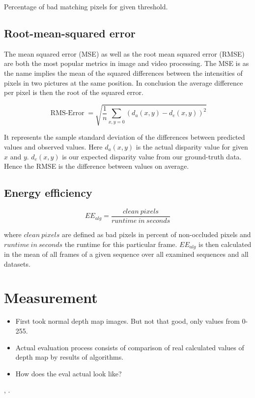 \noindent Percentage of bad matching pixels for given threshold.

\subsection*{Root-mean-squared error}

The mean squared error (MSE) as well as the root mean squared error (RMSE) are both the most popular metrics in image and video processing.
The MSE is as the name implies the mean of the squared differences between the intensities of pixels in two pictures at the same position.
In conclusion the average difference per pixel is then the root of the squared error.

\begin{equation}
  \operatorname{RMS-Error}=\sqrt{\frac{1}{n} \sum_{x,y=0}^{}(d_a(x,y) - d_e(x,y))^2}
\end{equation}

\noindent It represents the sample standard deviation of the differences between predicted values and observed values.
Here $d_a(x,y)$ is the actual disparity value for given $x$ and $y$.
$d_e(x,y)$ is our expected disparity value from our ground-truth data.
Hence the RMSE is the difference between values on average.

\subsection*{Energy efficiency}

\begin{equation}
  EE_{alg} = \frac{clean\ pixels}{runtime\ in\ seconds}
\end{equation}

\noindent where $clean\ pixels$ are defined as bad pixels in percent of non-occluded pixels and $runtime\ in\ seconds$ the runtime for this particular frame. $EE_{alg}$ is then calculated in the mean of all frames of a given sequence over all examined sequences and all datasets.

\section{Measurement}

\begin{itemize}
	\item First took normal depth map images. But not that good, only values from 0-255.
	\item Actual evaluation process consists of comparison of real calculated values of depth map by results of algorithms.
	\item How does the eval actual look like?
\end{itemize} \citep{benoit2008quality}, \citep{scharstein2002taxonomy}.

